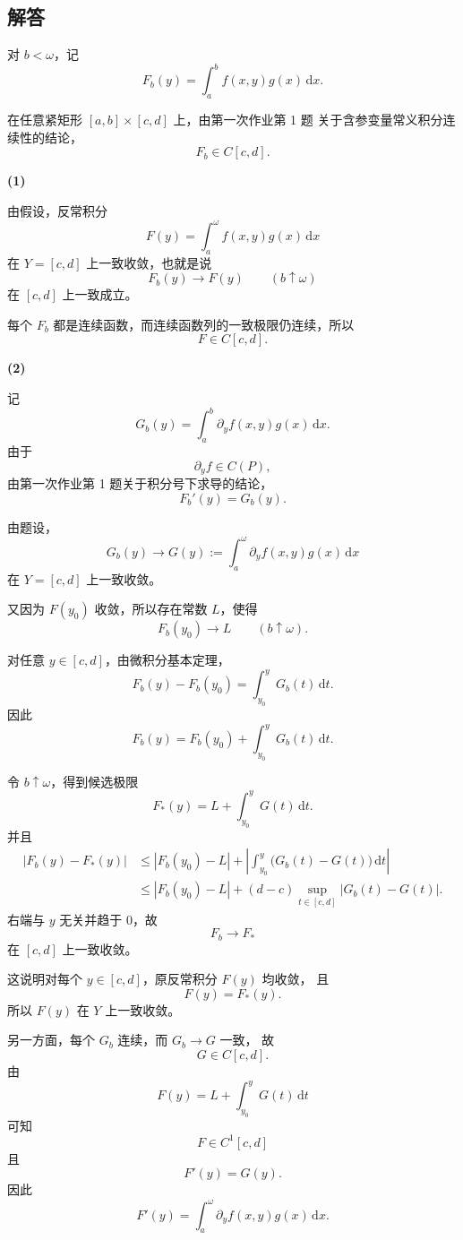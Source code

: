 \documentclass[12pt,a4paper]{ctexart}
\newcommand{\dd}{\,\mathrm d}
\begin{document}
\subsection*{解答}

对 \(b<\omega\)，记
\[
F_b(y)
=
\int_a^b f(x,y)g(x)\dd x.
\]

在任意紧矩形 \([a,b]\times[c,d]\) 上，由第一次作业第 1 题
关于含参变量常义积分连续性的结论，
\[
F_b\in C[c,d].
\]

\medskip

\noindent
\textbf{(1)}

由假设，反常积分
\[
F(y)=\int_a^\omega f(x,y)g(x)\dd x
\]
在 \(Y=[c,d]\) 上一致收敛，也就是说
\[
F_b(y)\longrightarrow F(y)
\qquad (b\uparrow\omega)
\]
在 \([c,d]\) 上一致成立。

每个 \(F_b\) 都是连续函数，而连续函数列的一致极限仍连续，所以
\[
\boxed{F\in C[c,d].}
\]

\medskip

\noindent
\textbf{(2)}

记
\[
G_b(y)
=
\int_a^b
\partial_y f(x,y)g(x)\dd x.
\]
由于
\[
\partial_y f\in C(P),
\]
由第一次作业第 1 题关于积分号下求导的结论，
\[
F_b'(y)=G_b(y).
\]

由题设，
\[
G_b(y)
\longrightarrow
G(y)
:=
\int_a^\omega
\partial_y f(x,y)g(x)\dd x
\]
在 \(Y=[c,d]\) 上一致收敛。

又因为 \(F(y_0)\) 收敛，所以存在常数 \(L\)，使得
\[
F_b(y_0)\longrightarrow L
\qquad (b\uparrow\omega).
\]

对任意 \(y\in[c,d]\)，由微积分基本定理，
\[
F_b(y)-F_b(y_0)
=
\int_{y_0}^yG_b(t)\dd t.
\]
因此
\[
F_b(y)
=
F_b(y_0)
+
\int_{y_0}^yG_b(t)\dd t.
\]

令 \(b\uparrow\omega\)，得到候选极限
\[
F_*(y)
=
L+\int_{y_0}^yG(t)\dd t.
\]
并且
\begin{align*}
|F_b(y)-F_*(y)|
&\le
|F_b(y_0)-L|
+
\left|
\int_{y_0}^y
\bigl(G_b(t)-G(t)\bigr)\dd t
\right|\\
&\le
|F_b(y_0)-L|
+
(d-c)
\sup_{t\in[c,d]}|G_b(t)-G(t)|.
\end{align*}
右端与 \(y\) 无关并趋于 \(0\)，故
\[
F_b\longrightarrow F_*
\]
在 \([c,d]\) 上一致收敛。

这说明对每个 \(y\in[c,d]\)，原反常积分 \(F(y)\) 均收敛，
且
\[
F(y)=F_*(y).
\]
所以 \(F(y)\) 在 \(Y\) 上一致收敛。

另一方面，每个 \(G_b\) 连续，而 \(G_b\to G\) 一致，
故
\[
G\in C[c,d].
\]
由
\[
F(y)
=
L+\int_{y_0}^yG(t)\dd t
\]
可知
\[
F\in C^1[c,d]
\]
且
\[
F'(y)=G(y).
\]
因此
\[
\boxed{
F'(y)
=
\int_a^\omega
\partial_y f(x,y)g(x)\dd x.
}
\]
\end{document}
